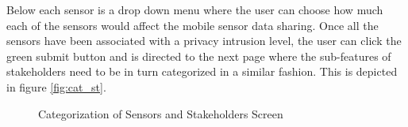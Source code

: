 Below each sensor is a drop down menu where the user can choose how much each of the sensors
would affect the mobile sensor data sharing. Once all the sensors have been associated with a privacy intrusion level, the user can click the green submit button and is directed to
the next page where the sub-features of stakeholders need to be in turn categorized in a similar fashion. This is depicted in
figure \ref{fig:cat_st}.

\begin{figure}[htp]
  \hspace{1em}
  \caption{Categorization of Sensors and Stakeholders Screen}
  \label{fig:cat1}
\end{figure}


